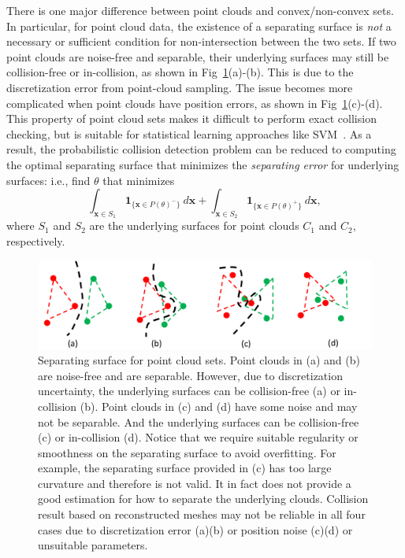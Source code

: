 There is one major difference between point clouds and convex/non-convex sets. In particular, for point cloud data, the existence of a separating surface is \emph{not} a necessary or sufficient condition for non-intersection between the two sets. If two point clouds are noise-free and separable, their underlying surfaces may still be collision-free or in-collision, as shown in Fig~\ref{fig:7:separating-point}(a)-(b). This is due to the discretization error from point-cloud sampling. The issue becomes more complicated when point clouds have position errors, as shown in Fig~\ref{fig:7:separating-point}(c)-(d).
This property of point cloud sets makes it difficult to perform exact collision checking, but is suitable for statistical learning approaches like SVM~\cite{Bi:2005}. As a result, the probabilistic collision detection problem can be reduced to computing the optimal separating surface that minimizes the \emph{separating error}
for underlying surfaces: i.e., find $\theta$ that minimizes
\begin{equation}
\label{eq:7:error}
\int_{\mathbf x \in S_1} \mathbf{1}_{\{\mathbf x \in P(\theta)^-\}} \ d\mathbf x + \int_{\mathbf x \in S_2} \mathbf{1}_{\{\mathbf x \in P(\theta)^+\}} \ d\mathbf x,
\end{equation}
where $S_1$ and $S_2$ are the underlying surfaces for point clouds $C_1$ and $C_2$, respectively.


\begin{figure}[htb]
  \centering
  \includegraphics[width=0.9\linewidth]{figs/7/separating-point.pdf}
  \caption[Separating surface for point cloud sets]{\label{fig:7:separating-point} Separating surface for point cloud sets. Point clouds in (a) and (b) are noise-free and are separable. However, due to discretization uncertainty, the underlying surfaces can be
  collision-free (a) or in-collision (b). Point clouds in (c) and (d) have some noise and may not be separable. And the underlying surfaces can be collision-free (c) or in-collision (d). Notice that we require suitable regularity or smoothness on the separating surface to avoid overfitting. For example, the separating surface provided in (c) has too large curvature and therefore is not valid. It in fact does not provide a good estimation for how to separate the underlying clouds. Collision result based on reconstructed meshes may not be reliable in all four cases due to discretization error (a)(b) or position noise (c)(d) or unsuitable parameters.}
\end{figure}


